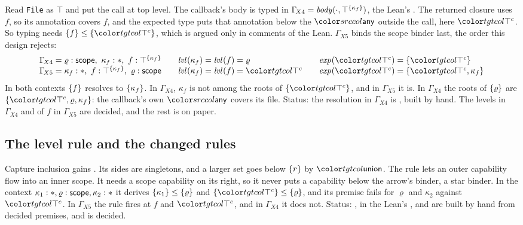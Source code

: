 \begin{example}\label{ex:lvl-escape}
Read \lstinline{File} as $\top$ and put the call at top level. The callback's body is typed in $\Gamma_{\!X4} = \mathit{body}(\cdot, \top^{\{\kappa_f\}})$, the Lean's . The returned closure uses $f$, so its annotation covers $f$, and the expected type puts that annotation below the $\cany$ outside the call, here $\topc$. So typing needs $\cset{f} \le \cset{\topc}$, which is argued only in comments of the Lean. $\Gamma_{\!X5}$ binds the scope binder last, the order this design rejects:
\[
\begin{array}{@{}l@{\qquad}l@{\qquad}l@{}}
\Gamma_{\!X4} = \varrho : \scopeb,\ \kappa_f : \cstar,\ f : \capt{\top}{\cset{\kappa_f}} & \lvl{}{\kappa_f} = \lvl{}{f} = \varrho & \expand{}{\topc} = \cset{\topc} \\
\Gamma_{\!X5} = \kappa_f : \cstar,\ f : \capt{\top}{\cset{\kappa_f}},\ \varrho : \scopeb & \lvl{}{\kappa_f} = \lvl{}{f} = \topc & \expand{}{\topc} = \cset{\topc, \kappa_f}
\end{array}
\]
In both contexts $\{f\}$ resolves to $\{\kappa_f\}$. In $\Gamma_{\!X4}$, $\kappa_f$ is not among the roots of $\cset{\topc}$, and in $\Gamma_{\!X5}$ it is. In $\Gamma_{\!X4}$ the roots of $\{\varrho\}$ are $\cset{\topc, \varrho, \kappa_f}$: the callback's own $\cany$ covers its file. Status: the resolution in $\Gamma_{\!X4}$ is , built by hand. The levels in $\Gamma_{\!X4}$ and of $f$ in $\Gamma_{\!X5}$ are decided, and the rest is on paper.
\end{example}

\subsection{The level rule and the changed rules}\label{sec:levels-rule}

Capture inclusion gains . Its sides are singletons, and a larger set goes below $\{r\}$ by $\ev{union}$. The rule lets an outer capability flow into an inner scope. It needs a scope capability on its right, so it never puts a capability below the arrow's binder, a star binder. In the context $\kappa_1 : \ast, \varrho : \mathsf{scope}, \kappa_2 : \ast$ it derives $\{\kappa_1\} \le \{\varrho\}$ and $\cset{\topc} \le \cset{\varrho}$, and its premise fails for $\varrho$ and $\kappa_2$ against $\topc$. In $\Gamma_{\!X5}$ the rule fires at $f$ and $\topc$, and in $\Gamma_{\!X4}$ it does not. Status: , in the Lean's , and  are built by hand from decided premises, and  is decided.

